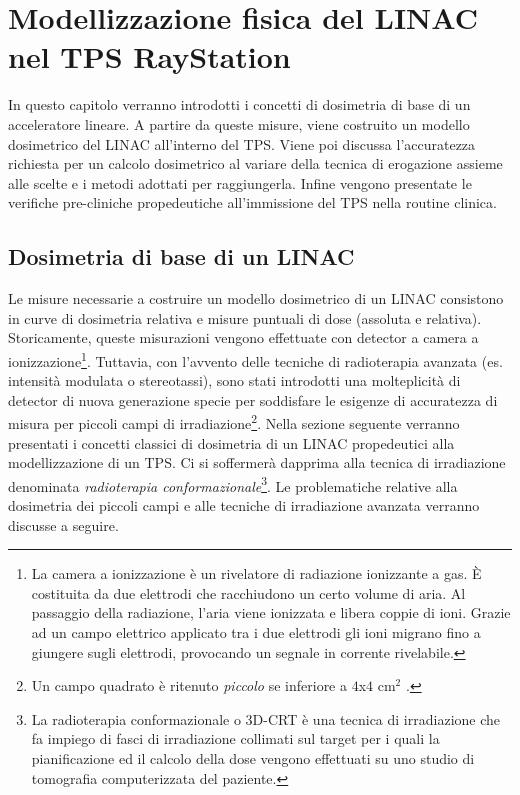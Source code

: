 \chapter{Modellizzazione f{}isica del LINAC nel TPS RayStation}
\minitoc
\textsf{In questo capitolo verranno introdotti i concetti di dosimetria di base di un acceleratore lineare. A partire da queste misure, viene costruito un modello dosimetrico del LINAC all'interno del TPS. Viene poi discussa l'accuratezza richiesta per un calcolo dosimetrico al variare della tecnica di erogazione assieme alle scelte e i metodi adottati per raggiungerla. Infine vengono presentate le verifiche pre-cliniche propedeutiche all'immissione del TPS nella routine clinica.}



\section{Dosimetria di base di un LINAC}
Le misure necessarie a costruire un modello dosimetrico di un LINAC consistono in curve di dosimetria relativa e misure puntuali di dose (assoluta e relativa).\\
Storicamente, queste misurazioni vengono effettuate con detector a camera a ionizzazione\footnote{La camera a ionizzazione è un rivelatore di radiazione ionizzante a gas. \`E costituita da due elettrodi che racchiudono un certo volume di aria. Al passaggio della radiazione, l'aria viene ionizzata e libera coppie di ioni. Grazie ad un campo elettrico applicato tra i due elettrodi gli ioni migrano fino a giungere sugli elettrodi, provocando un segnale in corrente rivelabile.}. Tuttavia, con l'avvento delle tecniche di radioterapia avanzata (es. intensità modulata o stereotassi), sono stati introdotti una molteplicità di detector di nuova generazione specie per soddisfare le esigenze di accuratezza di misura per piccoli campi di irradiazione\footnote{Un campo quadrato è ritenuto \textit{piccolo} se inferiore a $4$x$4$ cm$^2$ \cite{Das2008}.}. Nella sezione seguente verranno presentati i concetti classici di dosimetria di un LINAC propedeutici alla modellizzazione di un TPS. Ci si soffermerà dapprima alla tecnica di irradiazione denominata \textit{radioterapia conformazionale}\footnote{La radioterapia conformazionale o 3D-CRT è una tecnica di irradiazione che  fa impiego di fasci di irradiazione collimati sul target per i quali la pianificazione ed il calcolo della dose vengono effettuati su uno studio di tomografia computerizzata del paziente.}. Le problematiche relative alla dosimetria dei piccoli campi e alle tecniche di irradiazione avanzata verranno discusse a seguire. 

